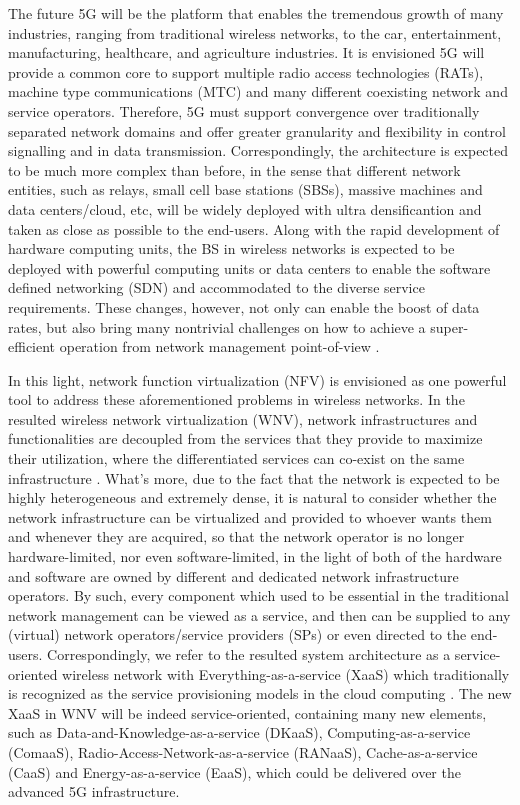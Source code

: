 \documentclass[12pt,draftclsnofoot,onecolumn]{IEEEtran}
\begin{document}
The future 5G will be the platform that enables the tremendous
growth of many industries, ranging from traditional wireless
networks, to the car, entertainment, manufacturing, healthcare,
and agriculture industries. It is envisioned 5G will provide a
common core to support multiple radio access technologies (RATs),
machine type communications (MTC) and many different coexisting
network and service operators. Therefore, 5G must support
convergence over traditionally separated network domains and offer
greater granularity and flexibility in control signalling and in
data transmission. Correspondingly, the architecture is expected
to be much more complex than before, in the sense that different
network entities, such as relays, small cell base stations (SBSs),
massive machines and data centers/cloud, etc, will be widely
deployed with ultra densificantion and taken as close as possible
to the end-users. Along with the rapid development of hardware
computing units, the BS in wireless networks is expected to be
deployed with powerful computing units or data centers to enable
the software defined networking (SDN) and accommodated to the
diverse service requirements. These changes, however, not only can
enable the boost of data rates, but also bring many nontrivial
challenges on how to achieve a super-efficient operation from
network management point-of-view \cite{Liang}. \par

In this light, network function virtualization (NFV) is envisioned
as one powerful tool to address these aforementioned problems in
wireless networks. In the resulted wireless network virtualization
(WNV), network infrastructures and functionalities are decoupled
from the services that they provide to maximize their utilization,
where the differentiated services can co-exist on the same
infrastructure \cite{Liang} \cite{Rost2}. What's more, due to the
fact that the network is expected to be highly heterogeneous and
extremely dense, it is natural to consider whether the network
infrastructure can be virtualized and provided to whoever wants
them and whenever they are acquired, so that the network operator
is no longer hardware-limited, nor even software-limited, in the
light of both of the hardware and software are owned by different
and dedicated network infrastructure operators. By such, every
component which used to be essential in the traditional network
management can be viewed as a service, and then can be supplied to
any (virtual) network operators/service providers (SPs) or even
directed to the end-users. Correspondingly, we refer to the
resulted system architecture as a service-oriented wireless
network with Everything-as-a-service (XaaS) which traditionally is
recognized as the service provisioning models in the cloud
computing \cite{Duan}. The new XaaS in WNV will be indeed
service-oriented, containing many new elements, such as
Data-and-Knowledge-as-a-service (DKaaS), Computing-as-a-service
(ComaaS), Radio-Access-Network-as-a-service (RANaaS),
Cache-as-a-service (CaaS) and Energy-as-a-service (EaaS), which
could be delivered over the advanced 5G infrastructure. \par
\end{document}
